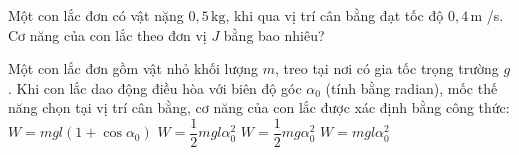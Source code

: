 
\begin{ex}
Một con lắc đơn có vật nặng $0,5\,\text{kg}$, khi qua vị trí cân bằng đạt tốc độ $0,4\,\text{m}$ /s. Cơ năng của con lắc theo đơn vị $J$ bằng bao nhiêu?
\end{ex}

\begin{ex}
Một con lắc đơn gồm vật nhỏ khối lượng $m$, treo tại nơi có gia tốc trọng trường $g$. Khi con lắc dao động điều hòa với biên độ góc $\alpha_0$ (tính bằng radian), mốc thế năng chọn tại vị trí cân bằng, cơ năng của con lắc được xác định bằng công thức:
\choice
{$W = mgl(1 + \cos\alpha_0)$}
{\True $W = \dfrac{1}{2}mgl\alpha_0^2$}
{$W = \dfrac{1}{2}mg\alpha_0^2$}
{$W = mgl\alpha_0^2$}
\end{ex}

